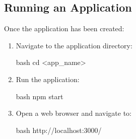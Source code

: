 \subsection{Running an Application}

Once the application has been created:
\begin{enumerate}
    \item Navigate to the application directory:
    \begin{mintedbox}{bash}
cd <app_name>
    \end{mintedbox}
    \item Run the application:
    \begin{mintedbox}{bash}
npm start
    \end{mintedbox}
    \item Open a web browser and navigate to:
    \begin{mintedbox}{bash}
http://localhost:3000/
    \end{mintedbox}
\end{enumerate}
